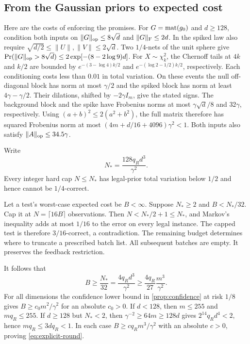 \subsection{From the Gaussian priors to expected cost}
\label{app:expected}

Here are the costs of enforcing the promises. For $G=\operatorname{mat}(g_0)$ and $d\ge128$, condition both inputs on $\|G\|_{\mathrm{op}}\le8\sqrt d$ and $\|G\|_{\mathrm F}\le 2d$. In the spiked law also require $\sqrt{d/2}\le\|U\|,\|V\|\le2\sqrt d$. Two $1/4$-nets of the unit sphere give
$\Pr(\|G\|_{\mathrm{op}}>8\sqrt d)\le 2\exp[-(8-2\log9)d]$.
For $X\sim\chi^2_k$, the Chernoff tails at $4k$ and $k/2$ are bounded by $e^{-(3-\log4)k/2}$ and $e^{-(\log2-1/2)k/2}$, respectively. Each conditioning costs less than $0.01$ in total variation. On these events the null off-diagonal block has norm at most $\gamma/2$ and the spiked block has norm at least $4\gamma-\gamma/2$. Their dilations, shifted by $-2\gamma I_m$, give the stated signs. The background block and the spike have Frobenius norms at most $\gamma\sqrt d/8$ and $32\gamma$, respectively. Using $(a+b)^2\le 2(a^2+b^2)$, the full matrix therefore has squared Frobenius norm at most $(4m+d/16+4096)\gamma^2<1$. Both inputs also satisfy $\|A\|_{\mathrm{op}}\le 34.5\gamma$.

Write
\[
 N_*=\frac{128q_Rd^3}{\gamma^2}.
\]
Every integer hard cap $N\le N_*$ has legal-prior total variation below $1/2$ and hence cannot be $1/4$-correct.

Let a test's worst-case expected cost be $B<\infty$. Suppose
$N_*\ge2$ and $B<N_*/32$. Cap it at $N=\lceil16B\rceil$ observations. Then
$N<N_*/2+1\le N_*$, and Markov's inequality adds at most $1/16$ to the error on every legal instance. The capped test is therefore $3/16$-correct, a contradiction. The remaining budget determines where to truncate a prescribed batch list. All subsequent batches are empty. It preserves the feedback restriction.

It follows that
\[
 B\ge\frac{N_*}{32}
   =\frac{4q_Rd^3}{\gamma^2}
   \ge\frac{4q_R}{27}\frac{m^3}{\gamma^2}.
\]
For all dimensions the confidence lower bound in \cref{prop:confidence} at risk $1/8$ gives $B\ge c_0 m^2/\gamma^2$ for an absolute $c_0>0$. If $d<128$, then $m\le255$ and $mq_R\le255$. If $d\ge128$ but $N_*<2$, then $\gamma^{-2}\ge64m\ge128d$ gives $2^{14}q_Rd^4<2$, hence $mq_R\le 3dq_R<1$. In each case $B\ge c q_R m^3/\gamma^2$ with an absolute $c>0$, proving \eqref{eq:explicit-round}.
